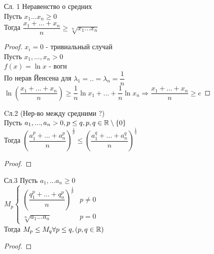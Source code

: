 Сл. 1 Неравенство о средних \\
Пусть $ x_1 ... x_n \geq 0 $ \\
Тогда $ \dfrac{x_1 + ... + x_n}{n} \geq \sqrt[n]{x_1...x_n} $ \\
\begin{proof}
	$ x_i = 0 $ - тривиальный случай \\
	Пусть $ x_1, ..., x_n > 0 $ \\
	$ f(x) = \ln x $ - вогн\\
	По нерав Йенсена для  $ \lambda_1 = .. = \lambda_n = \dfrac{1}{n} $ \\
	$ \ln(\dfrac{x_1 + ... + x_n}{n}) \geq \dfrac{1}{n} \ln x_1 + ... + \dfrac{1}{n} \ln x_n \Rightarrow \dfrac{x_1 + ... + x_n}{n} \geq e $ 
\end{proof}
Cл.2 (Нер-во между средними ?) \\
Пусть $ a_1, ..., a_n > 0, p \leq q, p, q \in \mathbb{R} \setminus \{0\} $ \\
Тогда $ (\dfrac{a_1^p + ... + a_n^p}{n})^{\frac{1}{p}} \leq  (\dfrac{a_1^q + ... + a_n^q}{n})^{\frac{1}{q}} $ \\
\begin{proof}
\end{proof}
Сл.3 Пусть $ a_1, ... a_n \geq 0 $ \\
$ M_p \left\{ \begin{array}{cc}
\left( \dfrac{q_1^p + ... + q_n^p}{n} \right)^{\frac{1}{p}} & p \neq 0  \\
\sqrt[n]{a_1 ... a_n} & p = 0 
\end{array} \right. $  \\
Тогда $ M_p \leq M_q \forall p \leq q, (p, q \in \mathbb{R}) $ \\
\begin{proof}
\end{proof}

